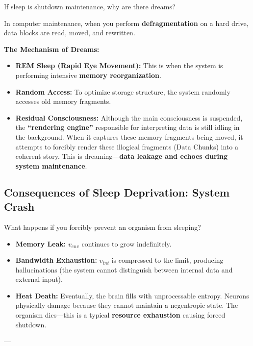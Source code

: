 If sleep is shutdown maintenance, why are there dreams?

In computer maintenance, when you perform \textbf{defragmentation} on a hard drive, data blocks are read, moved, and rewritten.

\textbf{The Mechanism of Dreams:}

\begin{itemize}
\item \textbf{REM Sleep (Rapid Eye Movement):} This is when the system is performing intensive \textbf{memory reorganization}.

\item \textbf{Random Access:} To optimize storage structure, the system randomly accesses old memory fragments.

\item \textbf{Residual Consciousness:} Although the main consciousness is suspended, the \textbf{``rendering engine''} responsible for interpreting data is still idling in the background. When it captures these memory fragments being moved, it attempts to forcibly render these illogical fragments (Data Chunks) into a coherent story. This is dreaming---\textbf{data leakage and echoes during system maintenance}.
\end{itemize}

\subsection{Consequences of Sleep Deprivation: System Crash}

What happens if you forcibly prevent an organism from sleeping?

\begin{itemize}
\item \textbf{Memory Leak:} \textbf{$v_{env}$} continues to grow indefinitely.

\item \textbf{Bandwidth Exhaustion:} \textbf{$v_{int}$} is compressed to the limit, producing hallucinations (the system cannot distinguish between internal data and external input).

\item \textbf{Heat Death:} Eventually, the brain fills with unprocessable entropy. Neurons physically damage because they cannot maintain a negentropic state. The organism dies---this is a typical \textbf{resource exhaustion} causing forced shutdown.
\end{itemize}

---

